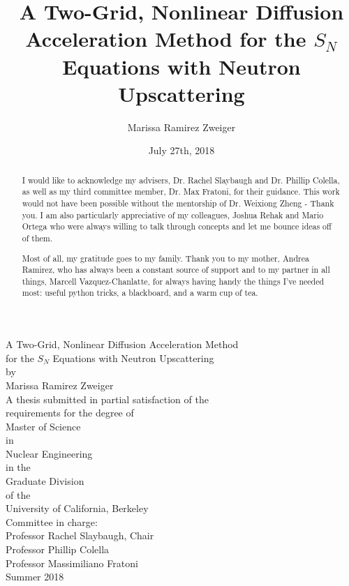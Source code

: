 \documentclass[12pt]{report}
\title{A Two-Grid, Nonlinear Diffusion Acceleration Method for the $S_N$ Equations with Neutron Upscattering}
\author{Marissa Ramirez Zweiger }
\date{July 27th, 2018}
\begin{document}
\pagestyle{empty}
\begin{center}
A Two-Grid, Nonlinear Diffusion Acceleration Method  \\ 
for the $S_N$ Equations with Neutron Upscattering \\
\vspace{20mm}
by \\
\vspace{5mm}
Marissa Ramirez Zweiger \\ 
\vspace{20mm}
A thesis submitted in partial
satisfaction of the \\
\vspace{5mm}
requirements for the degree of \\
\vspace{5mm}
Master of Science \\
\vspace{5mm}
in \\
\vspace{5mm}
Nuclear Engineering \\
\vspace{5mm}
in the \\
\vspace{5mm}
Graduate Division \\
\vspace{5mm}
of the \\
\vspace{5mm}
University of California, Berkeley \\
\vspace{20mm}
Committee in charge: \\
\vspace{5mm}
Professor Rachel Slaybaugh, Chair \\
Professor Phillip Colella \\
Professor Massimiliano Fratoni \\
\vspace{5mm}
Summer 2018
\end{center}




\renewcommand{\abstractname}{Acknowledgements}
\begin{abstract}
\thispagestyle{plain}
I would like to acknowledge my advisers, Dr. Rachel Slaybaugh and Dr. Phillip Colella, as well as my third committee member, Dr. Max Fratoni, for their guidance. This work would not have been possible without the mentorship of Dr. Weixiong Zheng - Thank you. I am also particularly appreciative of my colleagues, Joshua Rehak and Mario Ortega who were always willing to talk through concepts and let me bounce ideas off of them. 

Most of all, my gratitude goes to my family. Thank you to my mother, Andrea Ramirez, who has always been a constant source of support and to my partner in all things, Marcell Vazquez-Chanlatte, for always having handy the things I've needed most: useful python tricks, a blackboard, and a warm cup of tea. 
\end{abstract}
\setcounter{page}{2}
\pagestyle{plain}
\tableofcontents
\end{document}
